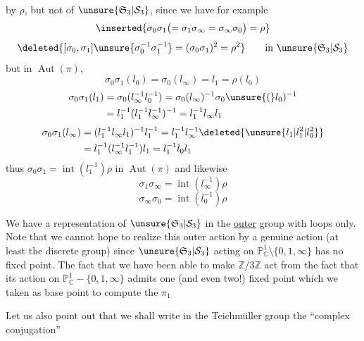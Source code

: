 by $\rho$, but not of $\unsure{\mathfrak S_3|\mathcal S_3}$, since we have for example
\[
\inserted{\sigma_0\sigma_1\bigl(=\sigma_1\sigma_\infty=\sigma_\infty\sigma_0\bigr)=\rho}
\]
\[
\deleted{[\sigma_0,\sigma_1]\unsure{\sigma_0^{-1}\sigma_1^{-1}}=(\sigma_0\sigma_1)^2=\rho^2}\qquad\text{in }\unsure{\mathfrak S_3|\mathcal S_3}
\]
but in $\operatorname{Aut}(\pi)$, 
\[
\sigma_0\sigma_1(l_0)=\sigma_0(l_\infty)=l_1=\rho(l_0)
\]
\[
\begin{aligned}
\sigma_0\sigma_1(l_1)&=\sigma_0(l_\infty^{-1}l_0^{-1})=\sigma_0(l_\infty)^{-1}\sigma_0\unsure{(}l_0)^{-1}\\
&=l_1^{-1}(l_1^{-1}l_\infty^{-1})^{-1}=l_1^{-1}l_\infty l_1
\end{aligned}
\]
\[
\begin{aligned}
\sigma_0\sigma_1(l_\infty)&=(l_1^{-1}l_\infty l_1)^{-1}l_1^{-1}=l_1^{-1}l_\infty^{-1}\deleted{\unsure{l_1|l_1^2|l_0^2}}\\
&=l_1^{-1}(l_\infty^{-1}l_1^{-1})l_1=l_1^{-1}l_0l_1
\end{aligned}
\]
thus $\sigma_0\sigma_1=\operatorname{int}(l_1^{-1})\rho$ in $\operatorname{Aut}(\pi)$
and likewise
\[
\sigma_1\sigma_\infty=\operatorname{int}(l_\infty^{-1})\rho
\]
\[
\sigma_\infty\sigma_0=\operatorname{int}(l_0^{-1})\rho
\]

We have a representation of $\unsure{\mathfrak S_3|\mathcal S_3}$ in the \uline{outer} group with loops only. Note that we cannot hope to realize this outer action by a genuine action (at least  the discrete group) since $\unsure{\mathfrak S_3|\mathcal S_3}$ acting on $\mathbb P^1_{\mathbb C}\setminus\{0,1,\infty\}$ has no fixed point. The fact that we have been able to make $\mathbb Z/3\mathbb Z$ act   from the fact that its action on $\mathbb P^1_{\mathbb C}-\{0,1,\infty\}$ admits one (and even two!) fixed point which we   taken as base point to compute the $\pi_1$

Let us also point out that we shall write in the Teichmüller group  the ``complex conjugation''
